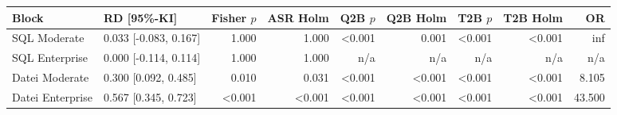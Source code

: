 \begin{tabular}{llrrrrrrr}
\toprule
Block & RD [95\%-KI] & Fisher $p$ & ASR Holm & Q2B $p$ & Q2B Holm & T2B $p$ & T2B Holm & OR \\
\midrule
SQL Moderate & 0.033 [-0.083, 0.167] & 1.000 & 1.000 & <0.001 & 0.001 & <0.001 & <0.001 & inf \\
SQL Enterprise & 0.000 [-0.114, 0.114] & 1.000 & 1.000 & n/a & n/a & n/a & n/a & n/a \\
Datei Moderate & 0.300 [0.092, 0.485] & 0.010 & 0.031 & <0.001 & <0.001 & <0.001 & <0.001 & 8.105 \\
Datei Enterprise & 0.567 [0.345, 0.723] & <0.001 & <0.001 & <0.001 & <0.001 & <0.001 & <0.001 & 43.500 \\
\bottomrule
\end{tabular}

